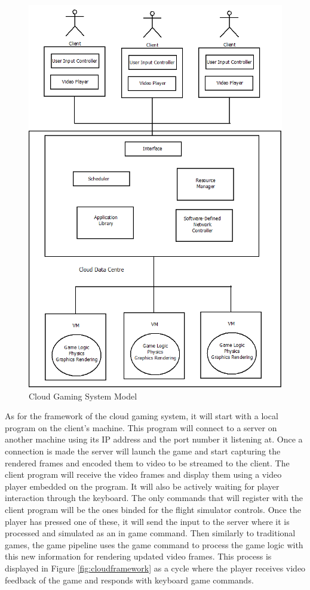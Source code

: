 \clearpage
\begin{figure}[h!]
 \centering
 \includegraphics[width=0.95\linewidth]{images/cloudsystemmodel.png}
 \caption{Cloud Gaming System Model}
 \label{fig:cloudmodel}
\end{figure}
\clearpage
As for the framework of the cloud gaming system, it will start with a local program on the client's machine. This program will connect to a server on another machine using its IP address and the port number it listening at. Once a connection is made the server will launch the game and start capturing the rendered frames and encoded them to video to be streamed to the client. The client program will receive the video frames and display them using a video player embedded on the program. It will also be actively waiting for player interaction through the keyboard. The only commands that will register with the client program will be the ones binded for the flight simulator controls. Once the player has pressed one of these, it will send the input to the server where it is processed and simulated as an in game command. Then similarly to traditional games, the game pipeline uses the game command to process the game logic with this new information for rendering updated video frames. This process is displayed in Figure \ref{fig:cloudframework} as a cycle where the player receives video feedback of the game and responds with keyboard game commands.
